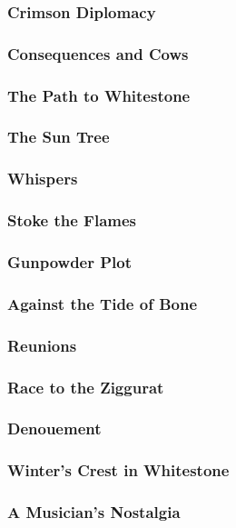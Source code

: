         \subsubsection{Crimson Diplomacy}
        \subsubsection{Consequences and Cows}
        \subsubsection{The Path to Whitestone}
        \subsubsection{The Sun Tree}
        \subsubsection{Whispers}
        \subsubsection{Stoke the Flames}
        \subsubsection{Gunpowder Plot}
        \subsubsection{Against the Tide of Bone}
        \subsubsection{Reunions}
        \subsubsection{Race to the Ziggurat}
        \subsubsection{Denouement}
        \subsubsection{Winter's Crest in Whitestone}
        \subsubsection{A Musician's Nostalgia}
